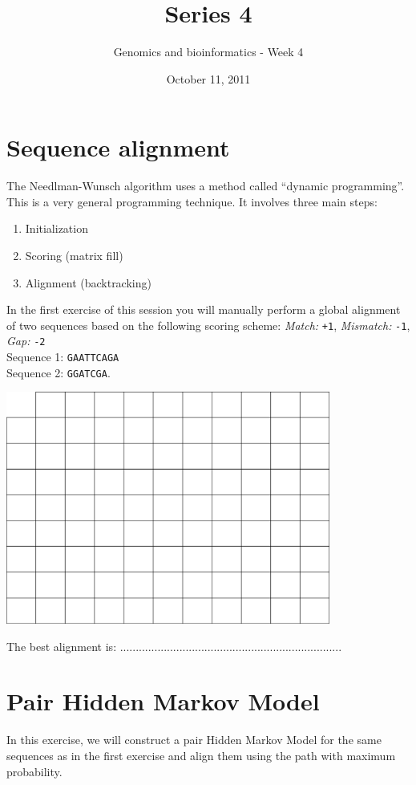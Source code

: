 \documentclass[a4paper,11pt]{article}
\title{Series 4}
\date{October 11, 2011}
\author{Genomics and bioinformatics - Week 4}
\begin{document}
\maketitle




\section{Sequence alignment}
The Needlman-Wunsch algorithm uses a method called ``dynamic programming''. This is a very general programming technique. It involves three main steps:
\begin{enumerate}
\item Initialization
\item Scoring (matrix fill)
\item Alignment (backtracking)
\end{enumerate}
In the first exercise of this session you will manually perform a global alignment of two sequences based on the following scoring scheme:
\emph{Match:} \texttt{+1}, \emph{Mismatch:} \texttt{-1}, \emph{Gap:} \texttt{-2}\\
Sequence 1: \texttt{GAATTCAGA}\\
Sequence 2: \texttt{GGATCGA}.
\vspace{0.5cm}
\begin{center}
\includegraphics[width=0.8\textwidth]{matrix.png}
\end{center}
\vspace{0.5cm}
The best alignment is: .......................................................................\\







\section{Pair Hidden Markov Model}
In this exercise, we will construct a pair Hidden Markov Model for
the same sequences as in the first exercise and align them using the
path with maximum probability.
\end{document}
